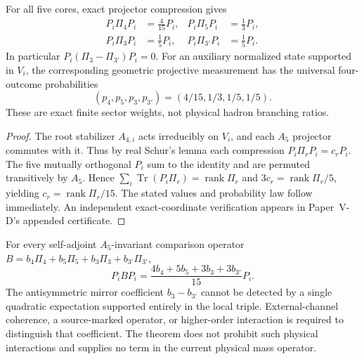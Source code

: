 \documentclass[12pt,a4paper]{article}
\begin{document}
\begin{theorem}
\label{p6:thm:v321-local-petersen-sector-weights}
For all five cores, exact projector compression gives
\[
 \boxed{\begin{aligned}
 P_i\Pi_4P_i&=\frac4{15}P_i,&
 P_i\Pi_5P_i&=\frac13P_i,\\
 P_i\Pi_3P_i&=\frac15P_i,&
 P_i\Pi_{3'}P_i&=\frac15P_i.
 \end{aligned}}
\]
In particular $P_i(\Pi_3-\Pi_{3'})P_i=0$. For an auxiliary normalized
state supported in $V_i$, the corresponding geometric projective measurement
has the universal four-outcome probabilities
\[
 \boxed{(p_4,p_5,p_3,p_{3'})=(4/15,1/3,1/5,1/5).}
\]
These are exact finite sector weights, not physical hadron branching ratios.
\end{theorem}
\begin{proof}
The root stabilizer $A_{4,i}$ acts irreducibly on $V_i$, and each $A_5$
projector commutes with it. Thus by real Schur's lemma each compression
$P_i\Pi_rP_i=c_rP_i$. The five mutually orthogonal $P_i$ sum to the
identity and are permuted transitively by $A_5$. Hence
$\sum_i\operatorname{Tr}(P_i\Pi_r)=\operatorname{rank}\Pi_r$ and
$3c_r=\operatorname{rank}\Pi_r/5$, yielding
$c_r=\operatorname{rank}\Pi_r/15$. The stated values and probability law
follow immediately. An independent exact-coordinate verification appears
in Paper~V-D's appended certificate.
\end{proof}

\begin{corollary}
\label{p6:cor:v321-local-mirror-odd-no-go}
For every self-adjoint $A_5$-invariant comparison operator
$B=b_4\Pi_4+b_5\Pi_5+b_3\Pi_3+b_{3'}\Pi_{3'}$,
\[
 \boxed{P_iBP_i=\frac{4b_4+5b_5+3b_3+3b_{3'}}{15}P_i.}
\]
The antisymmetric mirror coefficient $b_3-b_{3'}$ cannot be detected by a
single quadratic expectation supported entirely in the local triple.
External-channel coherence, a source-marked operator, or higher-order
interaction is required to distinguish that coefficient. The theorem does
not prohibit such physical interactions and supplies no term in the current
physical mass operator.
\end{corollary}
\end{document}
